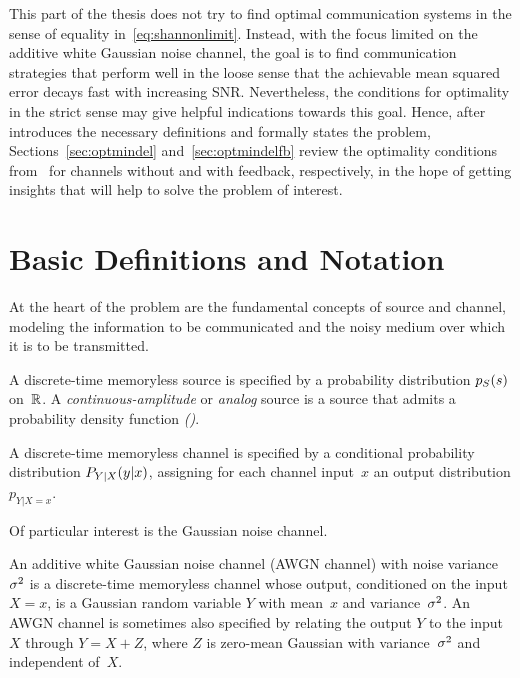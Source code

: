 This part of the thesis does not try to find optimal communication systems in
the sense of equality in~\eqref{eq:shannonlimit}. Instead, with the focus
limited on the additive white Gaussian noise channel, the goal is to find
communication strategies that perform well in the loose sense that the
achievable mean squared error decays fast with increasing SNR. Nevertheless, the
conditions for optimality in the strict sense may give helpful indications
towards this goal. Hence, after  introduces the necessary
definitions and  formally states the problem,
Sections~\ref{sec:optmindel} and~\ref{sec:optmindelfb} review the optimality
conditions from~\cite{GastparThesis} for channels without and with feedback,
respectively, in the hope of getting insights that will help to solve the
problem of interest. 


\section{Basic Definitions and Notation}\label{sec:defs}

At the heart of the problem are the fundamental concepts of source and channel,
modeling the information to be communicated and the noisy medium over which it
is to be transmitted. 

\begin{definition}[Source]
  \label{def:analogsource}
  A discrete-time memoryless source is specified by a probability distribution
  ${p_S}(s)$ on~$\mathbb{R}$. A \emph{continuous-amplitude} or \emph{analog} source is a
  source that admits a probability density function \emph{(\pdf)}.
\end{definition}

\begin{definition}[Channel]
  \label{def:dtmlc}
  A discrete-time memoryless channel is specified by a conditional probability
  distribution $P_{Y|X}(y|x)$, assigning for each channel input~$x$ an output
  distribution $p_{Y|X=x}$. 
\end{definition}

Of particular interest is the Gaussian noise channel. 
\begin{definition}
  \label{def:awgn}
  An additive white Gaussian noise channel (AWGN channel) with noise
  variance~${\sigma^2}$ is a discrete-time memoryless channel whose output, conditioned
  on the input $X=x$, is a Gaussian random variable $Y$ with mean~$x$ and
  variance~${\sigma^2}$. An AWGN channel is sometimes also specified by relating the
  output $Y$ to the input $X$ through $Y = X + Z$, where $Z$ is zero-mean
  Gaussian with variance~${\sigma^2}$ and independent of~$X$. 
\end{definition}

